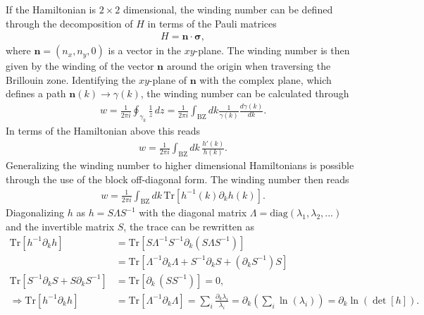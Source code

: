 If the Hamiltonian is $2\times 2$ dimensional, the winding number can be defined through the decomposition of $H$ in terms of the Pauli matrices
\begin{align}
    H =  \mathbf{n}\cdot \boldsymbol{\sigma},
\end{align}
where $\mathbf{n}=(n_x,n_y,0)$ is a vector in the $xy$-plane. The winding number is then given by the winding of the vector $\mathbf{n}$ around the origin when traversing the Brillouin zone. Identifying the $xy$-plane of $\mathbf{n}$ with the complex plane, which defines a path $\mathbf{n}(k)\rightarrow\gamma(k)$, the winding number can be calculated through
\begin{align*}
    w = \frac{1}{2\pi i} \oint_{\gamma_k}\frac1z\,dz = \frac{1}{2\pi i} \int_\text{BZ} dk \frac{1}{\gamma(k)}\frac{d\gamma(k)}{dk}.
\end{align*}
In terms of the Hamiltonian above this reads
\begin{align*}
    w= \frac{1}{2\pi i} \int_{\text{BZ}} dk\, \frac{h'(k)}{h(k)}.
\end{align*}
Generalizing the winding number to higher dimensional Hamiltonians is possible through the use of the block off-diagonal form. The winding number then reads \cite{maffeiTopologicalCharacterizationChiral2018,schnyderClassificationTopologicalInsulators2008}
\begin{align*}
    w = \frac{1}{2\pi i} \int_\text{BZ} dk \,\text{Tr}\left[h^{-1}(k) \partial_kh(k)\right].
\end{align*}
Diagonalizing $h$ as $h=S\Lambda S^{-1}$ with the diagonal matrix $\Lambda=\text{diag}(\lambda_1,\lambda_2,...)$ and the invertible matrix $S$, the trace can be rewritten as
\begin{align*}
    \text{Tr}\left[h^{-1} \partial_kh\right] &= \text{Tr}\left[S \Lambda^{-1} S^{-1} \partial_k(S \Lambda S^{-1})\right]\\
    &= \text{Tr}\left[\Lambda^{-1} \partial_k\Lambda + S^{-1}\partial_k S + (\partial_k S^{-1}) S\right]\\
    \text{Tr}\left[ S^{-1}\partial_k S + S \partial_k S^{-1}\right] &=
    \text{Tr}\left[\partial_k\,(S S^{-1})\right] = 0,\\
    \Rightarrow \text{Tr}\left[h^{-1} \partial_kh\right] &= \text{Tr}\left[\Lambda^{-1} \partial_k\Lambda\right] = \sum_i \frac{\partial_k \lambda_i}{\lambda_i} = \partial_k \left(\sum_i \ln(\lambda_i)\right) = \partial_k \ln(\det[h]).
\end{align*}

